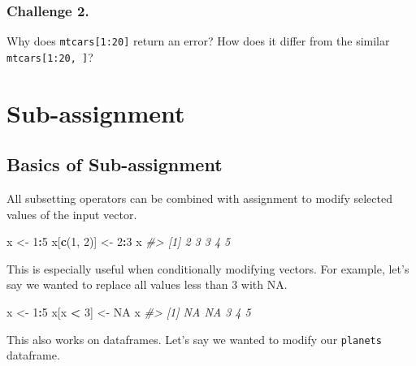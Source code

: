 \documentclass[]{book}
\newenvironment{Shaded}{\begin{snugshade}}{\end{snugshade}}
\newcommand{\CommentTok}[1]{\textcolor[rgb]{0.56,0.35,0.01}{\textit{#1}}}
\newcommand{\DecValTok}[1]{\textcolor[rgb]{0.00,0.00,0.81}{#1}}
\newcommand{\KeywordTok}[1]{\textcolor[rgb]{0.13,0.29,0.53}{\textbf{#1}}}
\newcommand{\NormalTok}[1]{#1}
\newcommand{\OperatorTok}[1]{\textcolor[rgb]{0.81,0.36,0.00}{\textbf{#1}}}
\newcommand{\OtherTok}[1]{\textcolor[rgb]{0.56,0.35,0.01}{#1}}
\newcommand{\StringTok}[1]{\textcolor[rgb]{0.31,0.60,0.02}{#1}}
\begin{document}
\hypertarget{challenge-2.-4}{%
\subsubsection*{Challenge 2.}\label{challenge-2.-4}}

Why does \texttt{mtcars{[}1:20{]}} return an error? How does it differ from the similar \texttt{mtcars{[}1:20,\ {]}}?

\hypertarget{sub-assignment}{%
\section{Sub-assignment}\label{sub-assignment}}

\hypertarget{basics-of-sub-assignment}{%
\subsection{Basics of Sub-assignment}\label{basics-of-sub-assignment}}

All subsetting operators can be combined with assignment to modify selected values of the input vector.

\begin{Shaded}
\begin{Highlighting}[]
\NormalTok{x <-}\StringTok{ }\DecValTok{1}\OperatorTok{:}\DecValTok{5}
\NormalTok{x[}\KeywordTok{c}\NormalTok{(}\DecValTok{1}\NormalTok{, }\DecValTok{2}\NormalTok{)] <-}\StringTok{ }\DecValTok{2}\OperatorTok{:}\DecValTok{3}
\NormalTok{x}
\CommentTok{#> [1] 2 3 3 4 5}
\end{Highlighting}
\end{Shaded}

This is especially useful when conditionally modifying vectors. For example, let's say we wanted to replace all values less than 3 with NA.

\begin{Shaded}
\begin{Highlighting}[]
\NormalTok{x <-}\StringTok{ }\DecValTok{1}\OperatorTok{:}\DecValTok{5}
\NormalTok{x[x }\OperatorTok{<}\StringTok{ }\DecValTok{3}\NormalTok{] <-}\StringTok{ }\OtherTok{NA}
\NormalTok{x}
\CommentTok{#> [1] NA NA  3  4  5}
\end{Highlighting}
\end{Shaded}

This also works on dataframes. Let's say we wanted to modify our \texttt{planets} dataframe.
\end{document}
